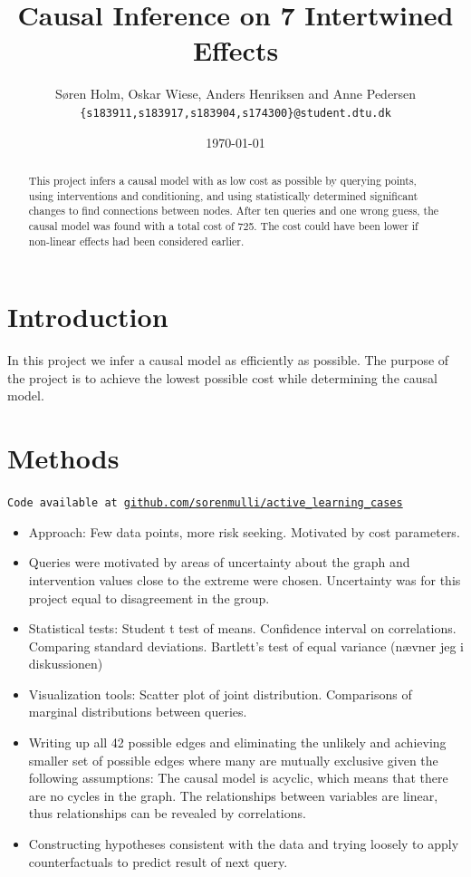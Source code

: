 \documentclass[12pt,fleqn,]{article}
\title{\vspace*{-3.75cm}Causal Inference on 7 Intertwined Effects \vspace*{-8mm}}
\author{\small Søren Holm, Oskar Wiese, Anders Henriksen and Anne Pedersen \\
\small {\texttt{\{s183911,s183917,s183904,s174300\}@student.dtu.dk}}}
\date{\vspace*{-3mm} \small \today}
\begin{document}
\maketitle

\vspace*{-1cm}
\footnotesize\begin{abstract}
\scriptsize \noindent This project infers a causal model with as low cost as possible by querying points, using interventions and conditioning, and using statistically determined significant changes to find connections between nodes. After ten queries and one wrong guess, the causal model was found with a total cost of 725. The cost could have been lower if non-linear effects had been considered earlier.
\end{abstract}


\begin{multicols}{2}
	
	
\section{Introduction} 

In this project we infer a causal model as efficiently as possible. The purpose of the project is to achieve the lowest possible cost while determining the causal model. 

\section{Methods}
\texttt{Code available at \url{github.com/sorenmulli/active_learning_cases}} \newline
\vspace*{-8mm} \begin{itemize}[noitemsep]
	\item Approach: Few data points, more risk seeking. Motivated by cost parameters.
	\item Queries were motivated by areas of uncertainty about the graph and intervention values close to the extreme were chosen. Uncertainty was for this project equal to disagreement in the group.
	\item Statistical tests: Student t test of means. Confidence interval on correlations. Comparing standard deviations. Bartlett's test of equal variance (nævner jeg i diskussionen)
	\item Visualization tools: Scatter plot of joint distribution. Comparisons of marginal distributions between queries.
	\item Writing up all 42 possible edges and eliminating the unlikely and achieving smaller set of possible edges where many are mutually exclusive given the following assumptions: The causal model is acyclic, which means that there are no cycles in the graph. The relationships between variables are linear, thus relationships can be revealed by correlations.
	\item Constructing hypotheses consistent with the data and trying loosely to apply counterfactuals to predict result of next query.
\end{itemize}


\end{multicols}
\end{document}
